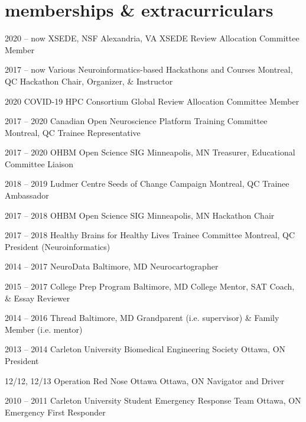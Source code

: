 \documentclass[]{friggeri-cv} %
\begin{document}
\section{memberships \& extracurriculars}

\begin{entrylist}
\entry
{2020 -- now}
{XSEDE, NSF}
{Alexandria, VA}
{XSEDE Review Allocation Committee Member}

\entry
{2017 -- now}
{Various Neuroinformatics-based Hackathons and Courses}
{Montreal, QC}
{Hackathon Chair, Organizer, \& Instructor}

\entry
{2020}
{COVID-19 HPC Consortium}
{Global}
{Review Allocation Committee Member}

\entry
{2017 -- 2020}
{Canadian Open Neuroscience Platform Training Committee}
{Montreal, QC}
{Trainee Representative}

\entry
{2017 -- 2020}
{OHBM Open Science SIG}
{Minneapolis, MN}
{Treasurer, Educational Committee Liaison}

\entry
{2018 -- 2019}
{Ludmer Centre Seeds of Change Campaign}
{Montreal, QC}
{Trainee Ambassador}

\entry
{2017 -- 2018}
{OHBM Open Science SIG}
{Minneapolis, MN}
{Hackathon Chair}

\entry
{2017 -- 2018}
{Healthy Brains for Healthy Lives Trainee Committee}
{Montreal, QC}
{President (Neuroinformatics)}

\entry
{2014 -- 2017}
{NeuroData}
{Baltimore, MD}
{Neurocartographer}

\entry
{2015 -- 2017}
{College Prep Program}
{Baltimore, MD}
{College Mentor, SAT Coach, \& Essay Reviewer}

\entry
{2014 -- 2016}
{Thread}
{Baltimore, MD}
{Grandparent (i.e. supervisor) \& Family Member (i.e. mentor) }

\entry
{2013 -- 2014}
{Carleton University Biomedical Engineering Society}
{Ottawa, ON}
{President}

\entry
{12/12, 12/13}
{Operation Red Nose Ottawa}
{Ottawa, ON}
{Navigator and Driver}

\entry
{2010 -- 2011}
{Carleton University Student Emergency Response Team}
{Ottawa, ON}
{Emergency First Responder}
\end{entrylist}

\end{document}
